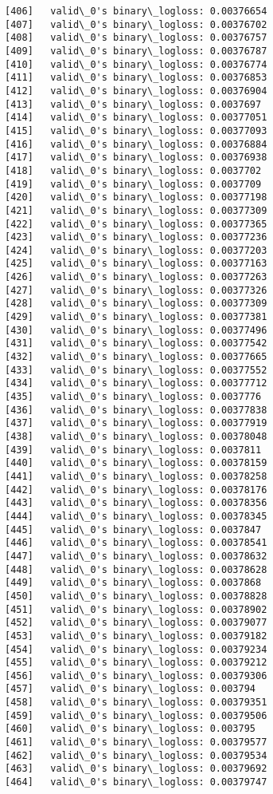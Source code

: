 \documentclass[11pt]{article}
\begin{document}
\begin{Verbatim}[commandchars=\\\{\}]
[406]	valid\_0's binary\_logloss: 0.00376654
[407]	valid\_0's binary\_logloss: 0.00376702
[408]	valid\_0's binary\_logloss: 0.00376757
[409]	valid\_0's binary\_logloss: 0.00376787
[410]	valid\_0's binary\_logloss: 0.00376774
[411]	valid\_0's binary\_logloss: 0.00376853
[412]	valid\_0's binary\_logloss: 0.00376904
[413]	valid\_0's binary\_logloss: 0.0037697
[414]	valid\_0's binary\_logloss: 0.00377051
[415]	valid\_0's binary\_logloss: 0.00377093
[416]	valid\_0's binary\_logloss: 0.00376884
[417]	valid\_0's binary\_logloss: 0.00376938
[418]	valid\_0's binary\_logloss: 0.0037702
[419]	valid\_0's binary\_logloss: 0.0037709
[420]	valid\_0's binary\_logloss: 0.00377198
[421]	valid\_0's binary\_logloss: 0.00377309
[422]	valid\_0's binary\_logloss: 0.00377365
[423]	valid\_0's binary\_logloss: 0.00377236
[424]	valid\_0's binary\_logloss: 0.00377203
[425]	valid\_0's binary\_logloss: 0.00377163
[426]	valid\_0's binary\_logloss: 0.00377263
[427]	valid\_0's binary\_logloss: 0.00377326
[428]	valid\_0's binary\_logloss: 0.00377309
[429]	valid\_0's binary\_logloss: 0.00377381
[430]	valid\_0's binary\_logloss: 0.00377496
[431]	valid\_0's binary\_logloss: 0.00377542
[432]	valid\_0's binary\_logloss: 0.00377665
[433]	valid\_0's binary\_logloss: 0.00377552
[434]	valid\_0's binary\_logloss: 0.00377712
[435]	valid\_0's binary\_logloss: 0.0037776
[436]	valid\_0's binary\_logloss: 0.00377838
[437]	valid\_0's binary\_logloss: 0.00377919
[438]	valid\_0's binary\_logloss: 0.00378048
[439]	valid\_0's binary\_logloss: 0.0037811
[440]	valid\_0's binary\_logloss: 0.00378159
[441]	valid\_0's binary\_logloss: 0.00378258
[442]	valid\_0's binary\_logloss: 0.00378176
[443]	valid\_0's binary\_logloss: 0.00378356
[444]	valid\_0's binary\_logloss: 0.00378345
[445]	valid\_0's binary\_logloss: 0.0037847
[446]	valid\_0's binary\_logloss: 0.00378541
[447]	valid\_0's binary\_logloss: 0.00378632
[448]	valid\_0's binary\_logloss: 0.00378628
[449]	valid\_0's binary\_logloss: 0.0037868
[450]	valid\_0's binary\_logloss: 0.00378828
[451]	valid\_0's binary\_logloss: 0.00378902
[452]	valid\_0's binary\_logloss: 0.00379077
[453]	valid\_0's binary\_logloss: 0.00379182
[454]	valid\_0's binary\_logloss: 0.00379234
[455]	valid\_0's binary\_logloss: 0.00379212
[456]	valid\_0's binary\_logloss: 0.00379306
[457]	valid\_0's binary\_logloss: 0.003794
[458]	valid\_0's binary\_logloss: 0.00379351
[459]	valid\_0's binary\_logloss: 0.00379506
[460]	valid\_0's binary\_logloss: 0.003795
[461]	valid\_0's binary\_logloss: 0.00379577
[462]	valid\_0's binary\_logloss: 0.00379534
[463]	valid\_0's binary\_logloss: 0.00379692
[464]	valid\_0's binary\_logloss: 0.00379747

\end{Verbatim}
\end{document}
